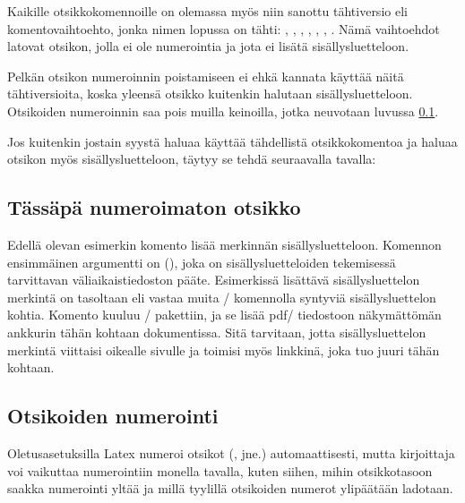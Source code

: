 \noindent
Kaikille otsikkokomennoille on olemassa myös niin sanottu tähtiversio
eli komentovaihtoehto, jonka nimen lopussa on tähti: ,
, , ,
, , .
Nämä vaihtoehdot latovat otsikon, jolla ei ole numerointia ja jota ei
lisätä sisällysluetteloon.

Pelkän otsikon numeroinnin poistamiseen ei ehkä kannata käyttää näitä
tähtiversioita, koska yleensä otsikko kuitenkin halutaan
sisällysluetteloon. Otsikoiden numeroinnin saa pois muilla keinoilla,
jotka neuvotaan luvussa \ref{luku/otsikot-numerointi}.

Jos kuitenkin jostain syystä haluaa käyttää tähdellistä otsikkokomentoa
ja haluaa otsikon myös sisällysluetteloon, täytyy se tehdä seuraavalla
tavalla:

\begin{koodilohkosis}
\section*{Tässäpä numeroimaton otsikko}
{}
\end{koodilohkosis}

\noindent
Edellä olevan esimerkin komento  lisää
merkinnän sisällysluetteloon. Komennon ensimmäinen argumentti on
 (), joka on sisällysluetteloiden
tekemisessä tarvittavan väliaikaistiedoston pääte. Esimerkissä lisättävä
sisällysluettelon merkintä on tasoltaan  eli vastaa muita
\-/ komennolla syntyviä sisällysluettelon kohtia.
Komento  kuuluu \-/
pakettiin, ja se lisää pdf\-/ tiedostoon näkymättömän ankkurin tähän
kohtaan dokumentissa. Sitä tarvitaan, jotta sisällysluettelon merkintä
viittaisi oikealle sivulle ja toimisi myös linkkinä, joka tuo juuri
tähän kohtaan.

\subsection{Otsikoiden numerointi}
\label{luku/otsikot-numerointi}

Oletusasetuksilla Latex numeroi otsikot (,
 jne.) automaattisesti, mutta kirjoittaja voi vaikuttaa
numerointiin monella tavalla, kuten siihen, mihin otsikkotasoon saakka
numerointi yltää ja millä tyylillä otsikoiden numerot ylipäätään
ladotaan.

